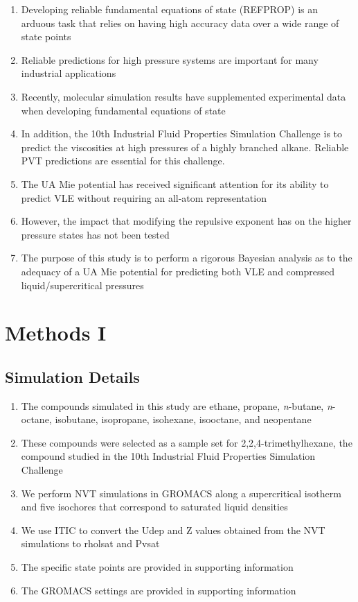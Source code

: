\documentclass[preprint,letterpaper,floatfix,citeautoscript,aip,jcp]{revtex4-1}
\begin{document}
\begin{enumerate}
	\item Developing reliable fundamental equations of state (REFPROP) is an arduous task that relies on having high accuracy data over a wide range of state points
	\item Reliable predictions for high pressure systems are important for many industrial applications
	\item Recently, molecular simulation results have supplemented experimental data when developing fundamental equations of state
	\item In addition, the 10th Industrial Fluid Properties Simulation Challenge is to predict the viscosities at high pressures of a highly branched alkane. Reliable PVT predictions are essential for this challenge.
	\item The UA Mie potential has received significant attention for its ability to predict VLE without requiring an all-atom representation
	\item However, the impact that modifying the repulsive exponent has on the higher pressure states has not been tested
	\item The purpose of this study is to perform a rigorous Bayesian analysis as to the adequacy of a UA Mie potential for predicting both VLE and compressed liquid/supercritical pressures
\end{enumerate}


\section{Methods I}

\subsection{Simulation Details}

\begin{enumerate}
	\item The compounds simulated in this study are ethane, propane, \textit{n}-butane, \textit{n}-octane, isobutane, isopropane, isohexane, isooctane, and neopentane
	\item These compounds were selected as a sample set for 2,2,4-trimethylhexane, the compound studied in the 10th Industrial Fluid Properties Simulation Challenge
	\item We perform NVT simulations in GROMACS along a supercritical isotherm and five isochores that correspond to saturated liquid densities
	\item We use ITIC to convert the Udep and Z values obtained from the NVT simulations to rholsat and Pvsat
	\item The specific state points are provided in supporting information
	\item The GROMACS settings are provided in supporting information
\end{enumerate}
\end{document}
